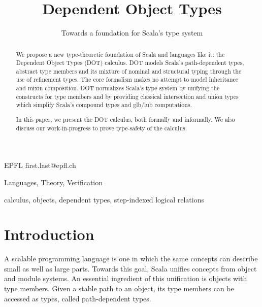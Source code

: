 \documentclass[9pt]{sigplanconf}
\begin{document}
\copyrightdata{[to be supplied]} 

\title{Dependent Object Types}
\subtitle{Towards a foundation for Scala's type system}

           {EPFL}
           {first.last@epfl.ch}

\maketitle

\begin{abstract}
We propose a new type-theoretic foundation of Scala and languages like
it: the Dependent Object Types (DOT) calculus. DOT models Scala's
path-dependent types, abstract type members and its mixture of nominal
and structural typing through the use of refinement types. The core
formalism makes no attempt to model inheritance and mixin
composition. DOT normalizes Scala's type system by unifying the
constructs for type members and by providing classical intersection
and union types which simplify Scala's compound types and glb/lub
computations.

In this paper, we present the DOT calculus, both formally and
informally. We also discuss our work-in-progress to prove type-safety
of the calculus.
\end{abstract}


\terms
Languages, Theory, Verification

\keywords
calculus, objects, dependent types, step-indexed logical relations

\section{Introduction}
A scalable programming language is one in which the same concepts can
describe small as well as large parts. Towards this goal, Scala
unifies concepts from object and module systems. An essential
ingredient of this unification is objects with type members. Given a
stable path to an object, its type members can be accessed as types,
called path-dependent types.
\end{document}
